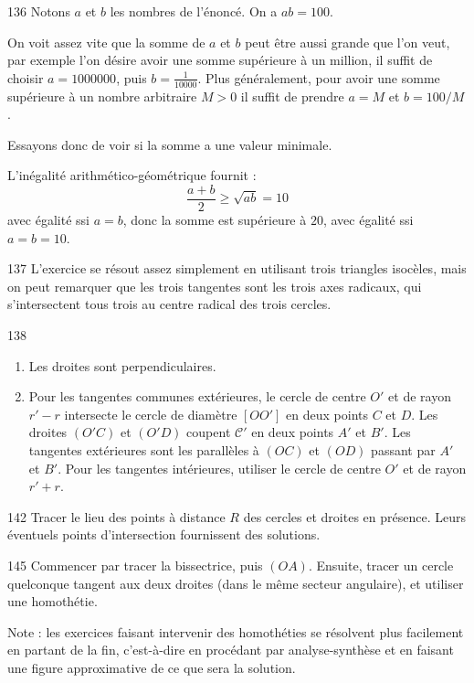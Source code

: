 \begin{Soln}{136}
Notons $a$ et $b$ les nombres de l'énoncé. On a $ab=100$.

On voit assez vite que la somme de $a$ et $b$ peut être aussi grande que l'on veut, par exemple l'on désire avoir une somme supérieure à un million, il suffit de choisir $a=1000000$, puis  $b=\frac{1}{10000}$. Plus généralement, pour avoir une somme supérieure à un nombre arbitraire $M>0$ il suffit de prendre $a=M$ et $b=100/M$.

Essayons donc de voir si la somme a une valeur minimale.

L'inégalité arithmético-géométrique fournit :
\[ \frac{a+b}{2}\geq \sqrt{ab}=10\]
avec égalité ssi $a=b$, donc la somme est supérieure à $20$, avec égalité ssi $a=b=10$.
\end{Soln}
\begin{Soln}{137}
L'exercice se résout assez simplement en utilisant trois triangles isocèles, mais on peut remarquer que les trois tangentes sont les trois axes radicaux, qui s'intersectent tous trois  au centre radical des trois cercles.
\end{Soln}
\begin{Soln}{138}
\begin{enumerate}
\item Les droites sont perpendiculaires.
\item Pour les tangentes communes extérieures, le cercle de centre $O'$ et de rayon $r'-r$ intersecte le cercle de diamètre $[OO']$ en deux points $C$ et $D$. Les droites $(O'C)$ et $(O'D)$ coupent $\mathcal C'$ en deux points $A'$ et $B'$. Les tangentes extérieures sont les parallèles à $(OC)$ et $(OD)$ passant par $A'$ et $B'$. Pour les tangentes intérieures, utiliser le cercle de centre $O'$ et de rayon $r'+r$.
\end{enumerate}
\end{Soln}
\begin{Soln}{142}
 Tracer le lieu des points à distance $R$ des cercles et droites en présence. Leurs éventuels points d'intersection fournissent des solutions.
\end{Soln}
\begin{Soln}{145}
Commencer par tracer la bissectrice, puis $(OA)$. Ensuite, tracer un cercle quelconque tangent aux deux droites (dans le même secteur angulaire), et utiliser une homothétie.

Note : les exercices faisant intervenir des homothéties se résolvent plus facilement en \og partant de la fin\fg, c'est-à-dire en procédant par analyse-synthèse et en faisant une figure approximative de ce que sera la solution.
\end{Soln}
